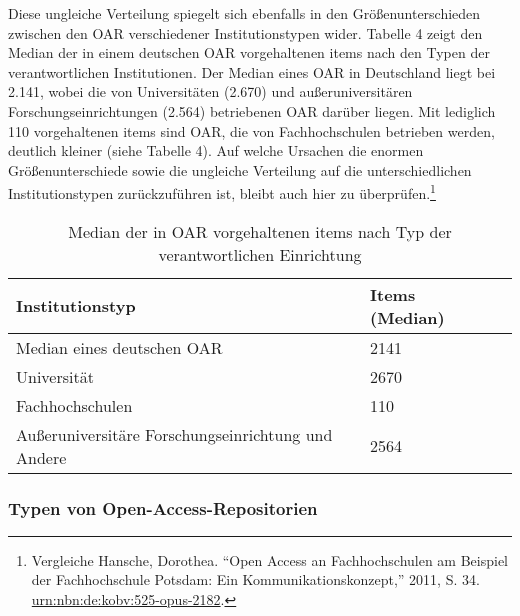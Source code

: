 \documentclass[a4paper,
fontsize=11pt,
oneside,
numbers=noperiodatend,
parskip=half-,
bibliography=totoc,
final
]{scrartcl}
\begin{document}
Diese ungleiche Verteilung spiegelt sich ebenfalls in den
Größenunterschieden zwischen den OAR verschiedener Institutionstypen
wider. Tabelle 4 zeigt den Median der in einem deutschen OAR
vorgehaltenen items nach den Typen der verantwortlichen Institutionen.
Der Median eines OAR in Deutschland liegt bei 2.141, wobei die von
Universitäten (2.670) und außeruniversitären Forschungseinrichtungen
(2.564) betriebenen OAR darüber liegen. Mit lediglich 110 vorgehaltenen
items sind OAR, die von Fachhochschulen betrieben werden, deutlich
kleiner (siehe Tabelle 4). Auf welche Ursachen die enormen
Größenunterschiede sowie die ungleiche Verteilung auf die
unterschiedlichen Institutionstypen zurückzuführen ist, bleibt auch hier
zu überprüfen.\footnote{Vergleiche Hansche, Dorothea. \enquote{Open
  Access an Fachhochschulen am Beispiel der Fachhochschule Potsdam: Ein
  Kommunikationskonzept,} 2011, S. 34.
  \href{http://nbn-resolving.de/urn:nbn:de:kobv:525-opus-2182}{urn:nbn:de:kobv:525-opus-2182}.}

\begin{table}[ht]
\centering
\small
\begin{tabular}{p{6cm} lr}
  \hline
Institutionstyp & Items (Median) \\ 
  \hline
Median eines deutschen OAR & 2141 \\ 
  Universität & 2670 \\ 
  Fachhochschulen & 110 \\ 
  Außeruniversitäre Forschungseinrichtung und Andere & 2564 \\ 
   \hline
\end{tabular}
\caption{Median der in OAR vorgehaltenen items nach Typ der
verantwortlichen Einrichtung}
\end{table}

\subsubsection*{Typen von
Open-Access-Repositorien}\label{typen-von-open-access-repositorien}
\end{document}
